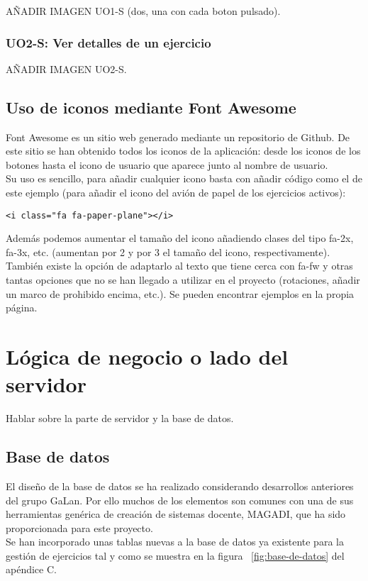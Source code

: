 AÑADIR IMAGEN UO1-S (dos, una con cada boton pulsado).

\subsubsection{UO2-S: Ver detalles de un ejercicio}
\label{diseno-e-implementacion:interfaces:alumno:uo2-s}

AÑADIR IMAGEN UO2-S.

\subsection{Uso de iconos mediante Font Awesome}
\label{diseno-e-implementacion:interfaces:font-awesome}

Font Awesome \hyperref[fontawesome]{\cite{fontawesome}} es un sitio web generado mediante un repositorio de Github. De este sitio se han obtenido todos los iconos de la aplicación: desde los iconos de los botones hasta el icono de usuario que aparece junto al nombre de usuario.\\

Su uso es sencillo, para añadir cualquier icono basta con añadir código como el de este ejemplo (para añadir el icono del avión de papel de los ejercicios activos):\\

\lstset{language=HTML}
\begin{lstlisting}[frame=single]
<i class="fa fa-paper-plane"></i>
\end{lstlisting}

Además podemos aumentar el tamaño del icono añadiendo clases del tipo fa-2x, fa-3x, etc. (aumentan por 2 y por 3 el tamaño del icono, respectivamente). También existe la opción de adaptarlo al texto que tiene cerca con fa-fw y otras tantas opciones que no se han llegado a utilizar en el proyecto (rotaciones, añadir un marco de prohibido encima, etc.). Se pueden encontrar ejemplos en la propia página.\\

\section{Lógica de negocio o lado del servidor}
\label{diseno-e-implementacion:logica-negocio}

Hablar sobre la parte de servidor y la base de datos.\\

\subsection{Base de datos}
\label{diseno-e-implementacion:logica-negocio:bd}

El diseño de la base de datos se ha realizado considerando desarrollos anteriores del grupo GaLan.
Por ello muchos de los elementos son comunes con una de sus herramientas genérica de creación
de sistemas docente, MAGADI, que ha sido proporcionada para este proyecto.\\

Se han incorporado unas tablas nuevas a la base de datos ya existente para la gestión de ejercicios tal y como se muestra en la figura ~\ref{fig:base-de-datos} del apéndice C.\\